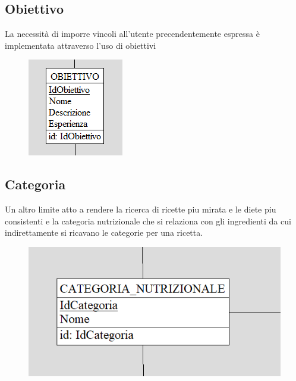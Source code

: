 ﻿\documentclass[a4paper,12pt]{report}
\begin{document}
\subsection{Obiettivo}
La necessità di imporre vincoli all'utente precendentemente espressa
è implementata attraverso l'uso di obiettivi
\begin{figure}[H]
    \centering
    \includegraphics[width=0.45\linewidth]{app_images/obiettivo-concettuale.png}
\end{figure}
\subsection{Categoria}
Un altro limite atto a rendere la ricerca di ricette
piu mirata e le diete piu consistenti e la categoria nutrizionale
che si relaziona con gli ingredienti da cui indirettamente si ricavano le categorie
per una ricetta.
\begin{figure}[H]
    \centering
    \includegraphics[width=0.6\linewidth]{app_images/categoria-nutrizionale.png}
\end{figure}
\end{document}
